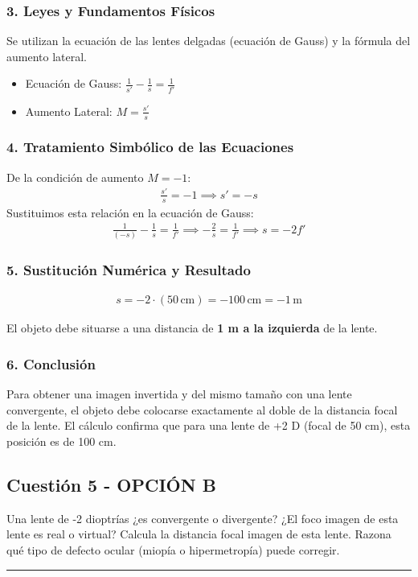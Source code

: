 \subsubsection*{3. Leyes y Fundamentos Físicos}
Se utilizan la ecuación de las lentes delgadas (ecuación de Gauss) y la fórmula del aumento lateral.
\begin{itemize}
    \item Ecuación de Gauss: $\frac{1}{s'} - \frac{1}{s} = \frac{1}{f'}$
    \item Aumento Lateral: $M = \frac{s'}{s}$
\end{itemize}
\subsubsection*{4. Tratamiento Simbólico de las Ecuaciones}
De la condición de aumento $M=-1$:
\begin{gather}
    \frac{s'}{s} = -1 \implies s' = -s
\end{gather}
Sustituimos esta relación en la ecuación de Gauss:
\begin{gather}
    \frac{1}{(-s)} - \frac{1}{s} = \frac{1}{f'} \implies -\frac{2}{s} = \frac{1}{f'} \implies s = -2f'
\end{gather}
\subsubsection*{5. Sustitución Numérica y Resultado}
\begin{gather}
    s = -2 \cdot (50\,\text{cm}) = -100\,\text{cm} = -1\,\text{m}
\end{gather}
\begin{cajaresultado}
El objeto debe situarse a una distancia de \textbf{1 m a la izquierda} de la lente.
\end{cajaresultado}
\subsubsection*{6. Conclusión}
\begin{cajaconclusion}
Para obtener una imagen invertida y del mismo tamaño con una lente convergente, el objeto debe colocarse exactamente al doble de la distancia focal de la lente. El cálculo confirma que para una lente de +2 D (focal de 50 cm), esta posición es de 100 cm.
\end{cajaconclusion}
\newpage

\subsection{Cuestión 5 - OPCIÓN B}
\label{subsec:5B_2019_jun_ord}
\begin{cajaenunciado}
Una lente de -2 dioptrías ¿es convergente o divergente? ¿El foco imagen de esta lente es real o virtual? Calcula la distancia focal imagen de esta lente. Razona qué tipo de defecto ocular (miopía o hipermetropía) puede corregir.
\end{cajaenunciado}
\hrule
